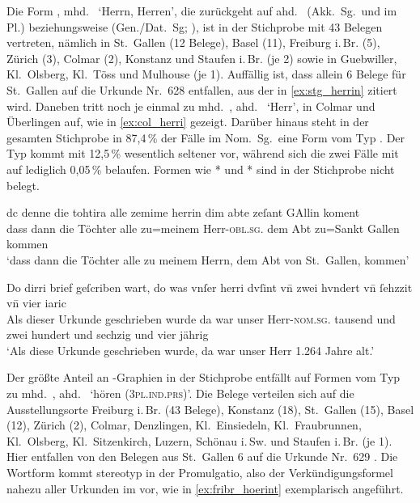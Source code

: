 Die Form , mhd.~ `Herrn, Herren', die zurückgeht auf
ahd.~ (Akk.~Sg.\ und im Pl.) beziehungsweise
 (Gen./Dat.~Sg; \cite[vgl.][282--283]{braune2018}), ist in der
Stichprobe mit 43 Belegen vertreten, nämlich in St.~Gallen (12 Belege), Basel
(11), Freiburg i.\,Br. (5), Zürich (3), Colmar (2), Konstanz und Staufen
i.\,Br. (je 2) sowie in Guebwiller, Kl.~Olsberg, Kl.~Töss und Mulhouse (je 1).
Auffällig ist, dass allein 6 Belege für St.~Gallen auf die Urkunde Nr.~628
\autocite[55,35--57,7]{cao2} entfallen, aus der in \cref{ex:stg_herrin} zitiert
wird. Daneben tritt noch je einmal  zu mhd.~,
ahd.~ `Herr', in Colmar und Überlingen auf, wie in
\cref{ex:col_herri} gezeigt. Darüber hinaus steht in der gesamten Stichprobe in
87,4\,\% der Fälle im Nom.~Sg.\ eine Form vom Typ . Der Typ
 kommt mit 12,5\,\% wesentlich seltener vor, während sich die zwei
Fälle mit  auf lediglich 0,05\,\% belaufen. Formen wie *
und * sind in der Stichprobe nicht belegt.

\begin{exe}
\ex \label{ex:herrin}
	\begin{xlist}
	\ex\label{ex:stg_herrin}
		\setlength{\glossglue}{5pt plus 2pt minus 1pt}
		\gll dc denne die tohtira alle zemime herrin dim abte zeſant GAllin
				koment\\
			dass dann die Töchter alle zu=meinem Herr-\textsc{obl.sg.\MascM}
				dem Abt zu=Sankt Gallen kommen \\
		\trans `dass dann die Töchter alle zu meinem Herrn, dem Abt von
			St.~Gallen, kommen'
			\parencites(Nr.~628, St.~Gallen, 1284)[56,34]{cao2}

	\ex\label{ex:col_herri}
		\gll Do dirri brief geſcriben wart, do was vnſer herri dvſint vn̄ zwei
				hvndert vn̄ ſehzzit vn̄ vier iaric \\
			Als dieser Urkunde geschrieben wurde da war unser
				Herr-\textsc{nom.sg.\MascM} tausend und zwei hundert und
				sechzig und vier jährig \\
		\trans `Als diese Urkunde geschrieben wurde, da war unser Herr
			1.264 Jahre alt.'
			\parencites(Nr.~N~53, Colmar, 1264)[37,15]{cao5}
\end{xlist}
\end{exe}

Der größte Anteil an -Graphien in der Stichprobe entfällt auf Formen vom
Typ  zu mhd.~, ahd.~ `hören
(\textsc{3pl.ind.prs})'. Die Belege verteilen sich auf die Ausstellungsorte
Freiburg i.\,Br. (43 Belege), Konstanz (18), St.~Gallen (15), Basel (12),
Zürich (2), Colmar, Denzlingen, Kl.~Einsiedeln, Kl.~Fraubrunnen, Kl.~Olsberg,
Kl.~Sitzenkirch, Luzern, Schönau i.\,Sw. und Staufen i.\,Br. (je 1). Hier
entfallen von den Belegen aus St.~Gallen 6 auf die Urkunde Nr.~629
\autocites(St.~Gallen, 1284)[57,9--57,35]{cao2}. Die Wortform 
kommt stereotyp in der Promulgatio, also der Verkündigungsformel nahezu aller
Urkunden im  vor, wie in \cref{ex:fribr_hoerint} exemplarisch
angeführt.

